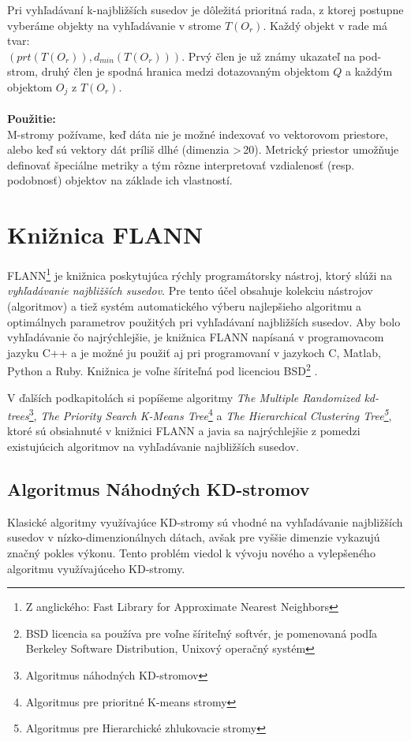 \documentclass[12pt,a4paper,oneside]{fithesis2}
\begin{document}
Pri vyhľadávaní k-najbližších susedov je dôležitá prioritná rada, z ktorej postupne vyberáme objekty na vyhľadávanie v strome $T(O_r)$. Každý objekt v rade má tvar:\\ $(prt(T(O_r)), d_{min}(T(O_r)))$. Prvý člen je už známy ukazateľ na pod-strom, druhý člen je spodná hranica medzi dotazovaným objektom $Q$ a každým objektom $O_j$ z $T(O_r)$.
\\ \\
\textbf{Použitie:} \\
M-stromy požívame, keď dáta nie je možné indexovať vo vektorovom priestore, alebo keď sú vektory dát príliš dlhé (dimenzia \textgreater \,20). Metrický priestor umožňuje definovať špeciálne metriky a tým rôzne interpretovať vzdialenosť (resp. podobnosť) objektov na základe ich vlastností.

	\chapter{Knižnica FLANN}
	FLANN\footnote{Z anglického: Fast Library for Approximate Nearest Neighbors} je knižnica poskytujúca rýchly programátorsky nástroj, ktorý slúži na \textit{vyhľadávanie najbližších susedov}. Pre tento účel obsahuje kolekciu nástrojov (algoritmov) a tiež systém automatického výberu najlepšieho algoritmu a optimálnych parametrov použitých pri vyhľadávaní najbližších susedov. Aby bolo vyhľadávanie čo najrýchlejšie, je knižnica FLANN napísaná v programovacom jazyku C++ a je možné ju použiť aj pri programovaní v jazykoch C, Matlab, Python a Ruby. Knižnica je voľne šíriteľná pod licenciou BSD\footnote{BSD licencia sa používa pre voľne šíriteľný softvér, je pomenovaná podľa Berkeley Software Distribution, Unixový operačný systém} \cite{flann_pami_2014}.
	
V ďalších podkapitolách si popíšeme algoritmy 
\textit{The Multiple Randomized kd-trees}\footnote{Algoritmus náhodných KD-stromov},
\textit{The Priority Search K-Means Tree}\footnote{Algoritmus pre prioritné K-means stromy} a 
\textit{The Hierarchical Clustering Tree\protect\footnote{Algoritmus pre Hierarchické zhlukovacie stromy}}, ktoré sú obsiahnuté v knižnici FLANN a javia sa najrýchlejšie z pomedzi existujúcich algoritmov na vyhľadávanie najbližších susedov.
	\section{Algoritmus Náhodných KD-stromov}
Klasické algoritmy využívajúce KD-stromy sú vhodné na vyhľadávanie najbližších susedov v nízko-dimenzionálnych dátach, avšak pre vyššie dimenzie vykazujú značný pokles výkonu. Tento problém viedol k vývoju nového a vylepšeného algoritmu využívajúceho KD-stromy. \cite{flann_pami_2014}	
	
\end{document}
